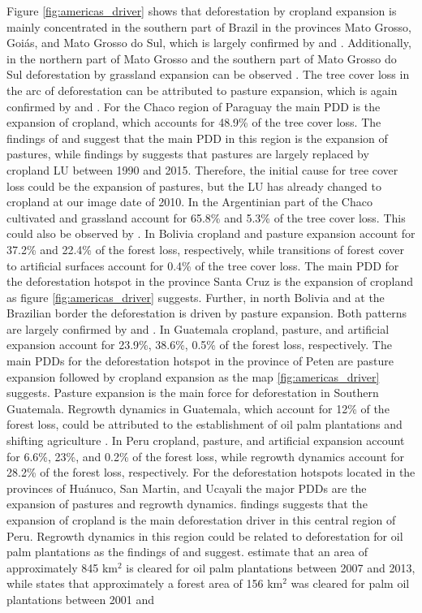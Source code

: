 			Figure \ref{fig:americas_driver} shows that deforestation by cropland expansion is mainly concentrated in the southern part of Brazil in the provinces Mato Grosso, Goi\'{a}s, and Mato Grosso do Sul, which is largely confirmed by \citet{Zalles2018} and \citet{Graesser2015}. Additionally, in the northern part of Mato Grosso and the southern part of Mato Grosso do Sul deforestation by grassland expansion can be observed \citep{Graesser2015,Sy2015}. The tree cover loss in the arc of deforestation can be attributed to pasture expansion, which is again confirmed by \citet{Sy2015} and \citet{Graesser2015}. For the Chaco region of Paraguay the main \ac{PDD} is the expansion of cropland, which accounts for 48.9\% of the tree cover loss. The findings of \citet{Graesser2015} and \citet{Caldas2013} suggest that the main \ac{PDD} in this region is the expansion of pastures, while findings by \citet{Graesser2018} suggests that pastures are largely replaced by cropland \ac{LU} between 1990 and 2015. Therefore, the initial cause for tree cover loss could be the expansion of pastures, but the \ac{LU} has already changed to cropland at our image date of 2010. In the Argentinian part of the Chaco cultivated and grassland account for 65.8\% and 5.3\% of the tree cover loss. This could also be observed by \citet{Sy2015}. In Bolivia cropland and pasture expansion account for 37.2\% and 22.4\% of the forest loss, respectively, while transitions of forest cover to artificial surfaces account for 0.4\% of the tree cover loss. The main \ac{PDD} for the deforestation hotspot in the province Santa Cruz is the expansion of cropland as figure \ref{fig:americas_driver} suggests. Further, in north Bolivia and at the Brazilian border the deforestation is driven by pasture expansion. Both patterns are largely confirmed by \citet{Graesser2015} and \citet{Sy2015}. In Guatemala cropland, pasture, and artificial expansion account for 23.9\%, 38.6\%, 0.5\% of the forest loss, respectively. The main \acp{PDD} for the deforestation hotspot in the province of Peten are pasture expansion followed by cropland expansion as the map \ref{fig:americas_driver} suggests. Pasture expansion is the main force for deforestation in Southern Guatemala. Regrowth dynamics in Guatemala, which account for 12\% of the forest loss, could be attributed to the establishment of oil palm plantations and shifting agriculture \citep{Furumo2017,Curtis2018}. In Peru cropland, pasture, and artificial expansion account for 6.6\%, 23\%, and 0.2\% of the forest loss, while regrowth dynamics account for 28.2\% of the forest loss, respectively. For the deforestation hotspots located in the provinces of Huánuco, San Martin, and Ucayali the major \acp{PDD} are the expansion of pastures and regrowth dynamics. \citet{Sy2015} findings suggests that the expansion of cropland is the main deforestation driver in this central region of Peru. Regrowth dynamics in this region could be related to deforestation for oil palm plantations as the findings of \citet{Vijay2018} and \citet{Furumo2017} suggest. \citet{Vijay2018} estimate that an area of approximately 845 km$^2$ is cleared for oil palm plantations between 2007 and 2013, while \citet{Furumo2017} states that approximately a forest area of 156 km$^2$ was cleared for palm oil plantations between 2001 and 